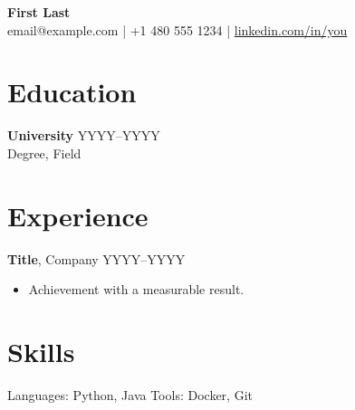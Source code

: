 \documentclass[10pt,letterpaper]{article}
\begin{document}
\begin{center}
  {\LARGE\bfseries First Last}\\[2pt]
  email@example.com \;|\; +1 480 555 1234 \;|\; \href{https://linkedin.com/in/you}{linkedin.com/in/you}
\end{center}

\section*{Education}
\textbf{University} \hfill YYYY--YYYY\\
Degree, Field

\section*{Experience}
\textbf{Title}, Company \hfill YYYY--YYYY
\begin{itemize}
  \item Achievement with a measurable result.
\end{itemize}

\section*{Skills}
Languages: Python, Java \quad Tools: Docker, Git
\end{document}
